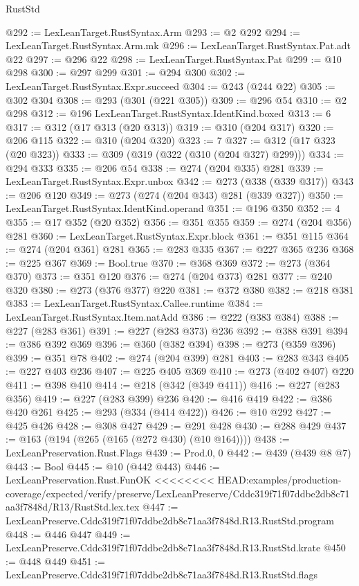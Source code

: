 \begin{lexlean}{RustStd}
\begin{coremodule}
{\begin{coremodule}
{{{{{{@292 := LexLeanTarget.RustSyntax.Arm
@293 := @2 @292
@294 := LexLeanTarget.RustSyntax.Arm.mk
@296 := LexLeanTarget.RustSyntax.Pat.adt @22
@297 := @296 @22
@298 := LexLeanTarget.RustSyntax.Pat
@299 := @10 @298
@300 := @297 @299
@301 := @294 @300
@302 := LexLeanTarget.RustSyntax.Expr.succeed
@304 := @243 (@244 @22)
@305 := @302 @304
@308 := @293 (@301 (@221 @305))
@309 := @296 @54
@310 := @2 @298
@312 := @196 LexLeanTarget.RustSyntax.IdentKind.boxed
@313 := 6
@317 := @312 (@17 @313 (@20 @313))
@319 := @310 (@204 @317)
@320 := @206 @115
@322 := @310 (@204 @320)
@323 := 7
@327 := @312 (@17 @323 (@20 @323))
@333 := @309 (@319 (@322 (@310 (@204 @327) @299)))
@334 := @294 @333
@335 := @206 @54
@338 := @274 (@204 @335) @281
@339 := LexLeanTarget.RustSyntax.Expr.unbox
@342 := @273 (@338 (@339 @317))
@343 := @206 @120
@349 := @273 (@274 (@204 @343) @281 (@339 @327))
@350 := LexLeanTarget.RustSyntax.IdentKind.operand
@351 := @196 @350
@352 := 4
@355 := @17 @352 (@20 @352)
@356 := @351 @355
@359 := @274 (@204 @356) @281
@360 := LexLeanTarget.RustSyntax.Expr.block
@361 := @351 @115
@364 := @274 (@204 @361) @281
@365 := @283 @335
@367 := @227 @365 @236
@368 := @225 @367
@369 := Bool.true
@370 := @368 @369
@372 := @273 (@364 @370)
@373 := @351 @120
@376 := @274 (@204 @373) @281
@377 := @240 @320
@380 := @273 (@376 @377) @220
@381 := @372 @380
@382 := @218 @381
@383 := LexLeanTarget.RustSyntax.Callee.runtime
@384 := LexLeanTarget.RustSyntax.Item.natAdd
@386 := @222 (@383 @384)
@388 := @227 (@283 @361)
@391 := @227 (@283 @373) @236
@392 := @388 @391
@394 := @386 @392 @369
@396 := @360 (@382 @394)
@398 := @273 (@359 @396)
@399 := @351 @78
@402 := @274 (@204 @399) @281
@403 := @283 @343
@405 := @227 @403 @236
@407 := @225 @405 @369
@410 := @273 (@402 @407) @220
@411 := @398 @410
@414 := @218 (@342 (@349 @411))
@416 := @227 (@283 @356)
@419 := @227 (@283 @399) @236
@420 := @416 @419
@422 := @386 @420 @261
@425 := @293 (@334 (@414 @422))
@426 := @10 @292
@427 := @425 @426
@428 := @308 @427
@429 := @291 @428
@430 := @288 @429
@437 := @163 (@194 (@265 (@165 (@272 @430) (@10 @164))))
@438 := LexLeanPreservation.Rust.Flags
@439 := Prod.{0, 0}
@442 := @439 (@439 @8 @7)
@443 := Bool
@445 := @10 (@442 @443)
@446 := LexLeanPreservation.Rust.FunOK
<<<<<<<< HEAD:examples/production-coverage/expected/verify/preserve/LexLeanPreserve/Cddc319f71f07ddbe2db8c71aa3f7848d/R13/RustStd.lex.tex
@447 := LexLeanPreserve.Cddc319f71f07ddbe2db8c71aa3f7848d.R13.RustStd.program
@448 := @446 @447
@449 := LexLeanPreserve.Cddc319f71f07ddbe2db8c71aa3f7848d.R13.RustStd.krate
@450 := @448 @449
@451 := LexLeanPreserve.Cddc319f71f07ddbe2db8c71aa3f7848d.R13.RustStd.flags
}}}}}}
\end{coremodule}}
\end{coremodule}
\end{lexlean}
